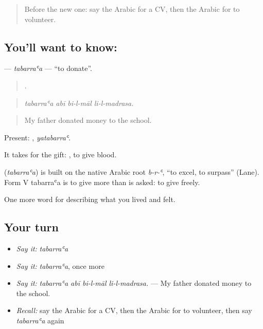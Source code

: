 \label{lesson:AR-C519-tabarraa}



\begin{quote}
Before the new one: say the Arabic for a CV, then the Arabic for to volunteer.
\end{quote}

\subsection*{You'll want to know: }
\textbf{} — \emph{tabarraʿa} — \textquotedblleft{}to donate\textquotedblright{}.

\begin{quote}
   .
\end{quote}

\begin{quote}
\emph{tabarraʿa abī bi-l-māl li-l-madrasa.}
\end{quote}

\begin{quote}
My father donated money to the school.
\end{quote}

Present: , \emph{yatabarraʿ}.

It takes  for the gift:  , to give blood.

\begin{cousinweb}
\textbf{} (\emph{tabarraʿa}) is built on the native Arabic root \emph{b-r-ʿ}, \textquotedblleft{}to excel, to surpass\textquotedblright{} (Lane). Form V tabarraʿa is to give more than is asked: to give freely.
\end{cousinweb}

\begin{grammarlens}[title={What you've built}]
One more word for describing what you lived and felt.
\end{grammarlens}

\subsection*{Your turn}
\begin{itemize}
\raggedright
  \item \emph{Say it:} \emph{tabarraʿa}
  \item \emph{Say it:} \emph{tabarraʿa}, once more
  \item \emph{Say it:} \emph{tabarraʿa abī bi-l-māl li-l-madrasa.} — My father donated money to the school.
  \item \emph{Recall:} say the Arabic for a CV, then the Arabic for to volunteer, then say \emph{tabarraʿa} again
\end{itemize}

